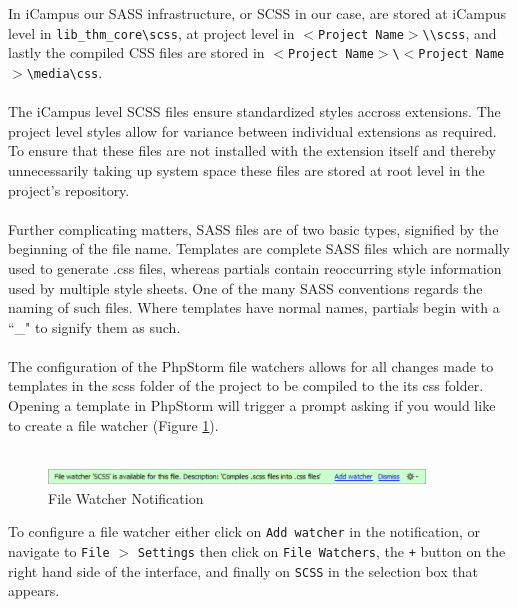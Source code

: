 \documentclass[]{report}
\begin{document}
In iCampus our SASS infrastructure, or SCSS in our case, are stored at iCampus level in \texttt{lib\_thm\_core\textbackslash scss}, at project level in \texttt{$<$Project Name$>$\textbackslash \textbackslash scss}, and lastly the compiled CSS files are stored in \texttt{$<$Project Name$>$\textbackslash $<$Project Name$>$\textbackslash media\textbackslash css}.\\
\\
The iCampus level SCSS files ensure standardized styles accross extensions. The project level styles allow for variance between individual extensions as required. To ensure that these files are not installed with the extension itself and thereby unnecessarily taking up system space these files are stored at root level in the project's repository.\\
\\
Further complicating matters, SASS files are of two basic types, signified by the beginning of the file name. Templates are complete SASS files which are normally used to generate .css files, whereas partials contain reoccurring style information used by multiple style sheets. One of the many SASS conventions regards the naming of such files. Where templates have normal names, partials begin with a ``\_" to signify them as such.\\
\\
The configuration of the PhpStorm file watchers allows for all changes made to templates in the scss folder of the project to be compiled to the its css folder. Opening a template in PhpStorm will trigger a prompt asking if you would like to create a file watcher (Figure \ref{fig:watchernotification}).\\
\\

\begin{figure}[h] 
	\centering
	\includegraphics[width=10cm]{scsswatchernotification.png}
	\caption{File Watcher Notification}
	\label{fig:watchernotification}
\end{figure}

\noindent
To configure a file watcher either click on \texttt{Add watcher} in the notification, or navigate to \texttt{File} $>$ \texttt{Settings} then click on \texttt{File Watchers}, the \texttt{+} button on the right hand side of the interface, and finally on \texttt{SCSS} in the selection box that appears.\\
\\
\end{document}
